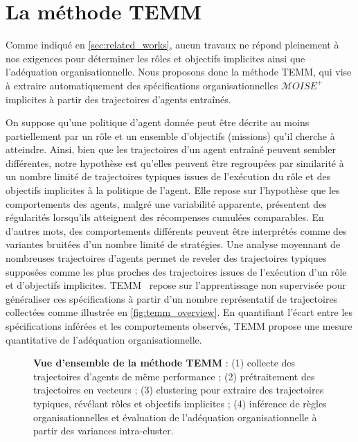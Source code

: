 \documentclass[francais,ROIA,Unicode,manuscript]{cedram}
\begin{document}
\section{La méthode TEMM}
\label{sec:TEMM_algorithm}

Comme indiqué en \autoref{sec:related_works}, aucun travaux ne répond pleinement à nos exigences pour déterminer les rôles et objectifs implicites ainsi que l'adéquation organisationnelle. Nous proposons donc la méthode TEMM, qui vise à extraire automatiquement des spécifications organisationnelles \(\mathcal{M}OISE^+\) implicites à partir des trajectoires d’agents entraînés.

On suppose qu'une politique d'agent donnée peut être décrite au moins partiellement par un rôle et un ensemble d'objectifs (missions) qu'il cherche à atteindre. Ainsi, bien que les trajectoires d'un agent entraîné peuvent sembler différentes, notre hypothèse est qu'elles peuvent être regroupées par similarité à un nombre limité de trajectoires typiques issues de l’exécution du rôle et des objectifs implicites à la politique de l'agent. Elle repose sur l’hypothèse que les comportements des agents, malgré une variabilité apparente, présentent des régularités lorsqu'ils atteignent des récompenses cumulées comparables. En d'autres mots, des comportements différents peuvent être interprétés comme des variantes bruitées d'un nombre limité de stratégies. Une analyse moyennant de nombreuses trajectoires d'agents permet de reveler des trajectoires typiques supposées comme les plus proches des trajectoires issues de l'exécution d'un rôle et d'objectifs implicites.
%
TEMM~\hyperref[fn:github]{\footnotemark[1]} repose sur l’apprentissage non supervisée pour généraliser ces spécifications à partir d'un nombre représentatif de trajectoires collectées comme illustrée en \autoref{fig:temm_overview}. En quantifiant l’écart entre les spécifications inférées et les comportements observés, TEMM propose une mesure quantitative de l'adéquation organisationnelle.

\begin{figure}[h!]
    \centering
    \resizebox{\textwidth}{!}{%
        
    }
    \caption{\textbf{Vue d'ensemble de la méthode TEMM} : (1) collecte des trajectoires d'agents de même performance ; (2) prétraitement des trajectoires en vecteurs ; (3) clustering pour extraire des trajectoires typiques, révélant rôles et objectifs implicites ; (4) inférence de règles organisationnelles et évaluation de l'adéquation organisationnelle à partir des variances intra-cluster.}
    \label{fig:temm_overview}
\end{figure}
\end{document}
